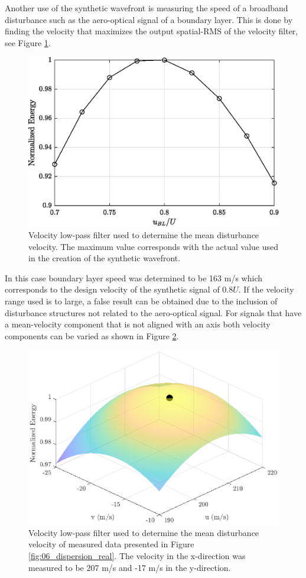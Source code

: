 Another use of the synthetic wavefront is measuring the speed of a broadband disturbance such as the aero-optical signal of a boundary layer.
This is done by finding the velocity that maximizes the output spatial-RMS of the velocity filter, see Figure \ref{fig:06_filter_velocity_measure}.
\begin{figure}
 \centering
 \includegraphics{../matlab/06_single_sensor_filtering/filter_velocity_measure.eps}
 \caption{Velocity low-pass filter used to determine the mean disturbance velocity.  The maximum value corresponds with the actual value used in the creation of the synthetic wavefront.}
 \label{fig:06_filter_velocity_measure}
\end{figure}
In this case boundary layer speed was determined to be 163 m/s which corresponds to the design velocity of the synthetic signal of $0.8U$.
If the velocity range used is to large, a false result can be obtained due to the inclusion of disturbance structures not related to the aero-optical signal.
For signals that have a mean-velocity component that is not aligned with an axis both velocity components can be varied as shown in Figure \ref{fig:06_filter_velocity_real}.
\begin{figure}
 \centering
 \includegraphics{../matlab/06_single_sensor_filtering/filter_velocity_real.eps}
 \caption{Velocity low-pass filter used to determine the mean disturbance velocity of measured data presented in Figure \ref{fig:06_dispersion_real}.  The velocity in the x-direction was measured to be 207 m/s and -17 m/s in the y-direction.}
 \label{fig:06_filter_velocity_real}
\end{figure}
